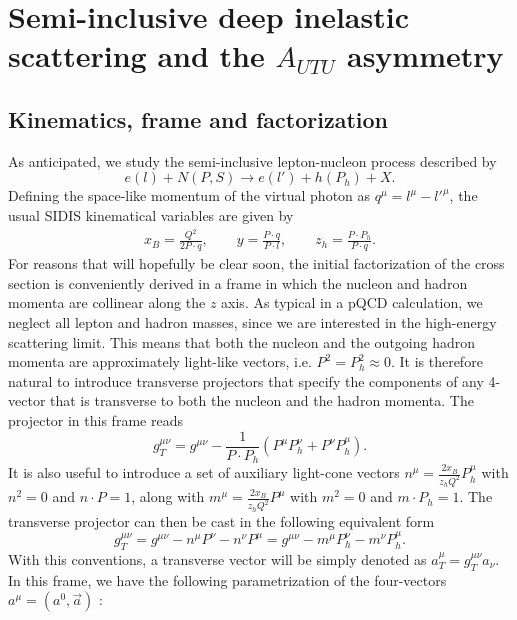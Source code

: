 
\chapter{Semi-inclusive deep inelastic scattering and the $A_{UTU}$ asymmetry}
\section{Kinematics, frame and factorization}
\noindent As anticipated, we study the semi-inclusive lepton-nucleon process described by
\begin{equation}
    e(l)+N(P,S) \longrightarrow e(l')+h(P_h)+X .
\end{equation}
Defining the space-like momentum of the virtual photon as $q^\mu=l^\mu-l'^\mu$, the usual SIDIS kinematical variables are given by
\begin{equation}
    \begin{aligned}
        x_B=\frac{Q^2}{2P\cdot q},\qquad y=\frac{P\cdot q}{P\cdot l},\qquad z_h=\frac{P\cdot P_h}{P\cdot q}.
    \end{aligned}
\end{equation}
For reasons that will hopefully be clear soon, the initial factorization of the cross section is conveniently derived in a frame in which the nucleon and hadron momenta are collinear along the $z$ axis. As typical in a pQCD calculation, we neglect all lepton and hadron masses, since we are interested in the high-energy scattering limit. This means that both the nucleon and the outgoing hadron momenta are approximately light-like vectors, i.e. $P^2=P_h^2\approx0$. It is therefore natural to introduce transverse projectors that specify the components of any 4-vector that is transverse to both the nucleon and the hadron momenta. The projector in this frame reads
\begin{equation}
    g_T^{\mu\nu}=g^{\mu\nu}-\frac{1}{P\cdot P_h}(P^\mu P_h^\nu+P^\nu P_h^\mu).
\end{equation}
It is also useful to introduce a set of auxiliary light-cone vectors $n^\mu=\frac{2x_B}{z_hQ^2}P_h^\mu$ with $n^2=0$ and $n\cdot P=1$, along with $m^\mu=\frac{2x_B}{z_hQ^2}P^\mu$ with $m^2=0$ and $m\cdot P_h=1$. The transverse projector can then be cast in the following equivalent form
\begin{equation}
    g^{\mu\nu}_T=g^{\mu\nu}-n^\mu P^\nu - n^\nu P^\mu=g^{\mu\nu}-m^\mu P_h^\nu - m^\nu P_h^\mu.
\end{equation}
With this conventions, a transverse vector will be simply denoted as $a_T^\mu=g^{\mu\nu}_Ta_\nu$. In this frame, we have the following parametrization of the four-vectors $a^\mu=(a^0,\vec a)$ \cite{}:
